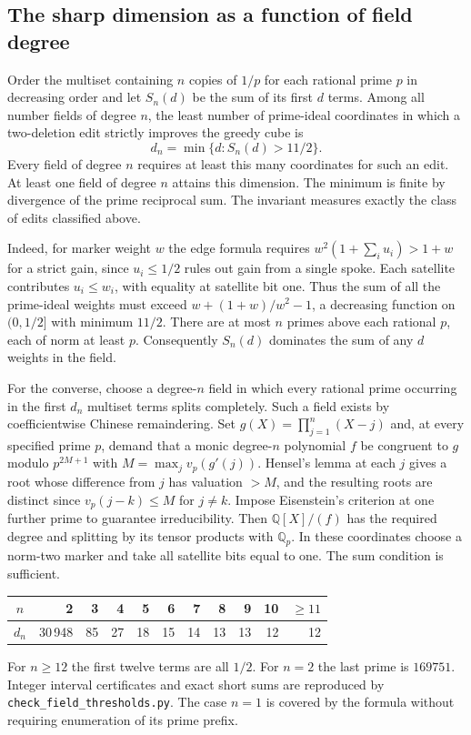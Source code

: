 \subsection{The sharp dimension as a function of field degree}
Order the multiset containing $n$ copies of $1/p$ for each rational prime $p$ in decreasing order and let $S_n(d)$ be the sum of its first $d$ terms.
Among all number fields of degree $n$, the least number of prime-ideal coordinates in which a two-deletion edit strictly improves the greedy cube is
\[
 d_n=\min\{d:S_n(d)>11/2\}.
\]
Every field of degree $n$ requires at least this many coordinates for such an edit. At least one field of degree $n$ attains this dimension. The minimum is finite by divergence of the prime reciprocal sum. The invariant measures exactly the class of edits classified above.

Indeed, for marker weight $w$ the edge formula requires $w^2(1+\sum_i u_i)>1+w$ for a strict gain, since $u_i\le 1/2$ rules out gain from a single spoke. Each satellite contributes $u_i\le w_i$, with equality at satellite bit one. Thus the sum of all the prime-ideal weights must exceed $w+(1+w)/w^2-1$, a decreasing function on $(0,1/2]$ with minimum $11/2$. There are at most $n$ primes above each rational $p$, each of norm at least $p$. Consequently $S_n(d)$ dominates the sum of any $d$ weights in the field.

For the converse, choose a degree-$n$ field in which every rational prime occurring in the first $d_n$ multiset terms splits completely. Such a field exists by coefficientwise Chinese remaindering. Set $g(X)=\prod_{j=1}^n(X-j)$ and, at every specified prime $p$, demand that a monic degree-$n$ polynomial $f$ be congruent to $g$ modulo $p^{2M+1}$ with $M=\max_j v_p(g'(j))$. Hensel's lemma at each $j$ gives a root whose difference from $j$ has valuation $>M$, and the resulting roots are distinct since $v_p(j-k)\le M$ for $j\ne k$. Impose Eisenstein's criterion at one further prime to guarantee irreducibility. Then $\mathbb Q[X]/(f)$ has the required degree and splitting by its tensor products with $\mathbb Q_p$. In these coordinates choose a norm-two marker and take all satellite bits equal to one. The sum condition is sufficient.

\begin{center}
\begin{tabular}{c|rrrrrrrrrr}
$n$&2&3&4&5&6&7&8&9&10&$\ge11$\\ \hline
$d_n$&30\,948&85&27&18&15&14&13&13&12&12
\end{tabular}
\end{center}
For $n\ge12$ the first twelve terms are all $1/2$. For $n=2$ the last prime is $169751$. Integer interval certificates and exact short sums are reproduced by \texttt{check\_field\_thresholds.py}. The case $n=1$ is covered by the formula without requiring enumeration of its prime prefix.

